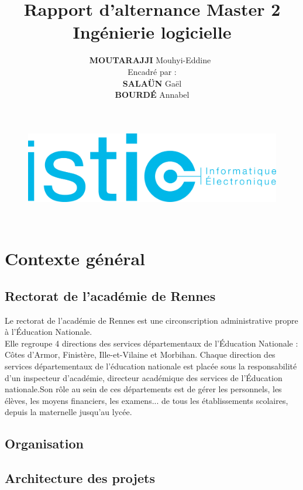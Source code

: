 \documentclass[a4paper]{article}
\title{\textbf{Rapport d'alternance Master 2 Ingénierie logicielle\\ }}
\author{\textbf{MOUTARAJJI} Mouhyi-Eddine\
\\Encadré par :\\\textbf{SALAÜN} Gaël \\\textbf{BOURDÉ} Annabel }
\begin{document}
\date{}

\begin{figure}
\centering
\includegraphics[width=1.1\textwidth]{diagrammes/logoisticfr_0.png}
\end{figure}


\maketitle

\newpage

\tableofcontents
~
\newpage



\section{Contexte général}
\subsection{Rectorat de l’académie de Rennes}

Le rectorat de l'académie de Rennes est une circonscription administrative propre à
l’Éducation Nationale.\\
Elle regroupe 4 directions des services départementaux de l'Éducation Nationale : 
Côtes d'Armor, Finistère, Ille-et-Vilaine et Morbihan. Chaque direction des services départementaux de l'éducation nationale est placée sous la responsabilité d'un inspecteur d'académie, directeur académique des services de l'Éducation nationale.Son rôle au sein de ces départements est de gérer les personnels, les élèves, les moyens financiers, les examens... de tous les établissements scolaires, depuis la maternelle jusqu'au lycée.

\subsection{Organisation}

\subsection{Architecture des projets}
\end{document}

